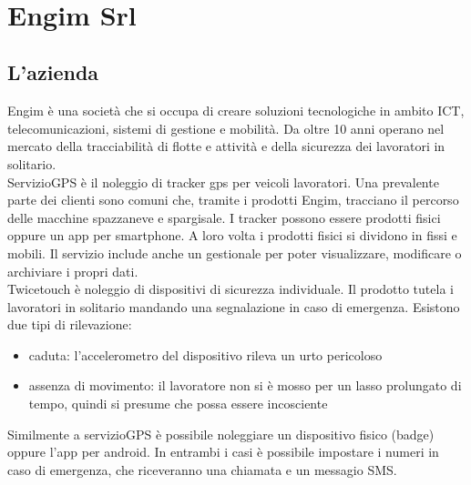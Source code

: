 \documentclass[12pt]{article}
\begin{document}
\thispagestyle{empty}
\newpage 
\thispagestyle{empty}
\
\newpage

\section{Engim Srl}
\subsection{L'azienda}
Engim è una società che si occupa di creare soluzioni tecnologiche in ambito 
ICT, telecomunicazioni, sistemi di gestione e mobilità. Da oltre 10 anni operano 
nel mercato della tracciabilità di flotte e attività e della 
sicurezza dei lavoratori in solitario.
\\ ServizioGPS è il noleggio di tracker gps per veicoli lavoratori. 
Una prevalente parte dei clienti sono comuni che, tramite i prodotti Engim, 
tracciano il percorso delle macchine spazzaneve e spargisale.
I tracker possono essere prodotti fisici oppure un app per smartphone. A loro 
volta i prodotti fisici si dividono in fissi e mobili. Il servizio include
anche un gestionale per poter visualizzare, modificare o archiviare i propri dati.
\\ Twicetouch è noleggio di dispositivi di sicurezza individuale.
Il prodotto tutela i lavoratori in solitario mandando una segnalazione in caso di
emergenza. Esistono due tipi di rilevazione: 
\begin{itemize}
  \item caduta: l'accelerometro del dispositivo rileva un urto pericoloso
  \item assenza di movimento: il lavoratore non si è mosso per un lasso prolungato di tempo, 
  quindi si presume che possa essere incosciente
\end{itemize}
Similmente a servizioGPS è possibile noleggiare un dispositivo fisico (badge) oppure
l'app per android. In entrambi i casi è possibile impostare i numeri in caso di 
emergenza, che riceveranno una chiamata e un messagio SMS.
\end{document}
